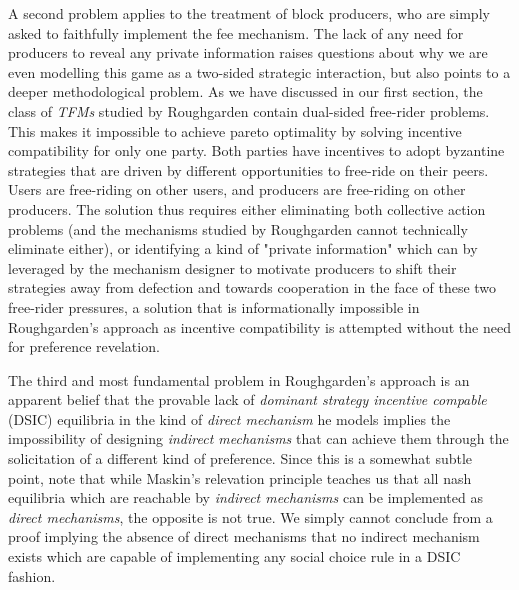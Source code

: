 \documentclass[sigconf,anonymous]{aamas}
\begin{document}
A second problem applies to the treatment of block producers, who are simply asked to faithfully implement the fee mechanism. The lack of any need for producers to reveal any private information raises questions about why we are even modelling this game as a two-sided strategic interaction, but also points to a deeper methodological problem. As we have discussed in our first section, the class of \textit{TFMs} studied by Roughgarden contain dual-sided free-rider problems. This makes it impossible to achieve pareto optimality by solving incentive compatibility for only one party. Both parties have incentives to adopt byzantine strategies that are driven by different opportunities to free-ride on their peers. Users are free-riding on other users, and producers are free-riding on other producers. The solution thus requires either eliminating both collective action problems (and the mechanisms studied by Roughgarden cannot technically eliminate either), or identifying a kind of "private information" which can by leveraged by the mechanism designer to motivate producers to shift their strategies away from defection and towards cooperation in the face of these two free-rider pressures, a solution that is informationally impossible in Roughgarden's approach as incentive compatibility is attempted without the need for preference revelation.

The third and most fundamental problem in Roughgarden's approach is an apparent belief that the provable lack of \textit{dominant strategy incentive compable} (DSIC) equilibria in the kind of \textit{direct mechanism} he models implies the impossibility of designing \textit{indirect mechanisms} that can achieve them through the solicitation of a different kind of preference. Since this is a somewhat subtle point, note that while Maskin's relevation principle teaches us that all nash equilibria which are reachable by \textit{indirect mechanisms} can be implemented as \textit{direct mechanisms}, the opposite is not true. We simply cannot conclude from a proof implying the absence of direct mechanisms that no indirect mechanism exists which are capable of implementing any social choice rule in a DSIC fashion.
\end{document}
